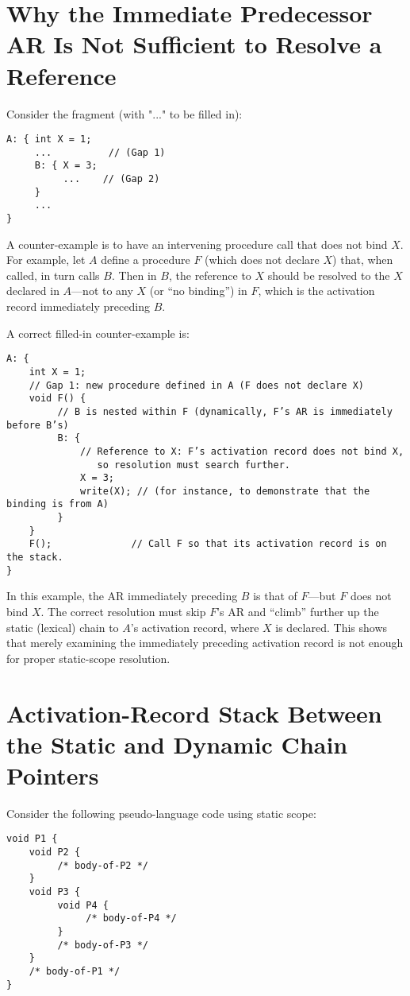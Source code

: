 \documentclass{article}
\begin{document}
\section{Why the Immediate Predecessor AR Is Not Sufficient to Resolve a Reference}
Consider the fragment (with "..." to be filled in):

\begin{verbatim}
A: { int X = 1;
     ...          // (Gap 1)
     B: { X = 3;
          ...    // (Gap 2)
     }
     ... 
}
\end{verbatim}

A counter-example is to have an intervening procedure call that does not bind \(X\). For example, let \(A\) define a procedure \(F\) (which does not declare \(X\)) that, when called, in turn calls \(B\). Then in \(B\), the reference to \(X\) should be resolved to the \(X\) declared in \(A\)—not to any \(X\) (or ``no binding'') in \(F\), which is the activation record immediately preceding \(B\).

A correct filled-in counter-example is:

\begin{verbatim}
A: {
    int X = 1;
    // Gap 1: new procedure defined in A (F does not declare X)
    void F() {
         // B is nested within F (dynamically, F’s AR is immediately before B’s)
         B: {
             // Reference to X: F’s activation record does not bind X,
                so resolution must search further.
             X = 3;
             write(X); // (for instance, to demonstrate that the binding is from A)
         }
    }
    F();              // Call F so that its activation record is on the stack.
}
\end{verbatim}

In this example, the AR immediately preceding \(B\) is that of \(F\)—but \(F\) does not bind \(X\). The correct resolution must skip \(F\)'s AR and ``climb'' further up the static (lexical) chain to \(A\)'s activation record, where \(X\) is declared. This shows that merely examining the immediately preceding activation record is not enough for proper static-scope resolution.

\section{Activation-Record Stack Between the Static and Dynamic Chain Pointers}
Consider the following pseudo-language code using static scope:

\begin{verbatim}
void P1 {
    void P2 { 
         /* body-of-P2 */
    }
    void P3 {
         void P4 { 
              /* body-of-P4 */
         }
         /* body-of-P3 */
    }
    /* body-of-P1 */
}
\end{verbatim}
\end{document}
